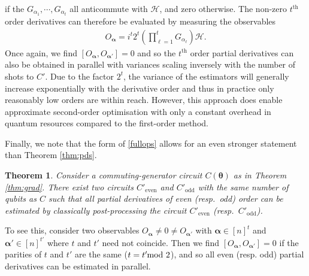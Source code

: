 \documentclass[twocolumn]{revtex4-2}
\newtheorem{theorem}{Theorem}
\renewcommand{\vec}{\boldsymbol}
\newcommand{\joe}[1]{\textcolor{blue}{[joe: #1]}}
\newcommand{\nospacemod}{\hspace{-7pt}\mod}
\begin{document}
%
if the $G_{\alpha_1},\cdots,G_{\alpha_t}$ all anticommute with $\mathcal{H}$, and zero otherwise. The non-zero $t^{\text{th}}$ order derivatives can therefore be evaluated by measuring the observables 
\begin{align}\label{fullops}
O_{\vec{\alpha}}=i^{t}2^t\left(\prod_{\ell=1}^t G_{\alpha_\ell}\right)\mathcal{H}.
\end{align} 
%
Once again, we find $[O_{\vec{\alpha}},O_{\vec{\alpha}'}]=0$ and so the $t^{\text{th}}$ order partial derivatives can also be obtained in parallel with variances scaling inversely with the number of shots to $C'$. Due to the factor $2^t$, the variance of the estimators will generally increase exponentially with the derivative order and thus in practice only reasonably low orders are within reach. However, this approach does enable approximate second-order optimisation with only a constant overhead in quantum resources compared to the first-order method.

Finally, we note that the form of \eqref{fullops} allows for an even stronger statement than Theorem \ref{thm:pds}.
%
\begin{theorem}
Consider a commuting-generator circuit $C(\vec{\theta})$ as in Theorem \ref{thm:grad}. There exist two circuits ${C}'_{\text{even}}$ and ${C}'_\text{odd}$ with the same number of qubits as $C$ such that all partial derivatives of even (resp.\ odd) order can be estimated by classically post-processing the circuit ${C}'_{\text{even}}$ (resp.\ ${C}'_{\text{odd}}$).
\end{theorem}
%
To see this, consider two observables $O_{\vec{\alpha}}\neq 0\neq O_{\vec{\alpha}'}$ with $\vec{\alpha}\in[n]^t$ and $\vec{\alpha}'\in[n]^{t'}$ where $t$ and $t'$ need not coincide.
Then we find $[O_{\vec{\alpha}},O_{\vec{\alpha}'}]=0$ if the parities of $t$ and $t'$ are the same ($t=t' \nospacemod 2$), and so all even (resp. odd) partial derivatives can be estimated in parallel.

\end{document}
